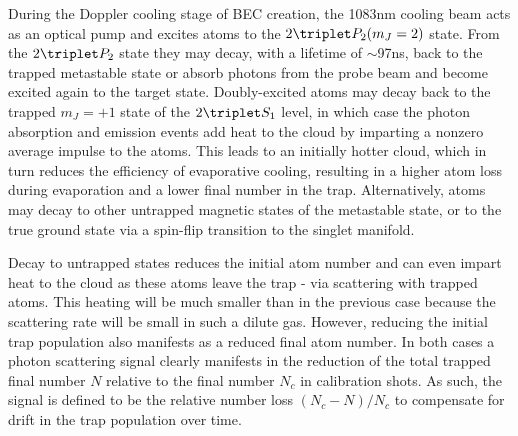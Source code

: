 	During the Doppler cooling stage of BEC creation, the 1083nm cooling beam acts as an optical pump and excites atoms to the $2\triplet P_2(m_J=2)$ state.
	From the $2\triplet P_2$ state they may decay, with a lifetime of $\sim$97ns, back to the trapped metastable state or absorb photons from the probe beam and become excited again to the target state.
	Doubly-excited atoms may decay back to the trapped $m_J=+1$ state of the $2\triplet S_1$ level, in which case the photon absorption and emission events add heat to the cloud by imparting a nonzero average impulse to the atoms.
	This leads to an initially hotter cloud, which in turn reduces the efficiency of evaporative cooling, resulting in a higher atom loss during evaporation and a lower final number in the trap. Alternatively, atoms may decay to other untrapped magnetic states of the metastable state, or to the true ground state via a spin-flip transition to the singlet manifold.

	Decay to untrapped states reduces the initial atom number and can even impart heat to the cloud as these atoms leave the trap - via scattering with trapped atoms.
	This heating will be much smaller than in the previous case because the scattering rate will be small in such a dilute gas.
	However, reducing the initial trap population also manifests as a reduced final atom number.
	In both cases a photon scattering signal clearly manifests in the reduction of the total trapped final number $N$ relative to the final number $N_c$ in calibration shots.
	As such, the signal is defined to be the relative number loss $(N_c-N)/N_c$ to compensate for drift in the trap population over time.

